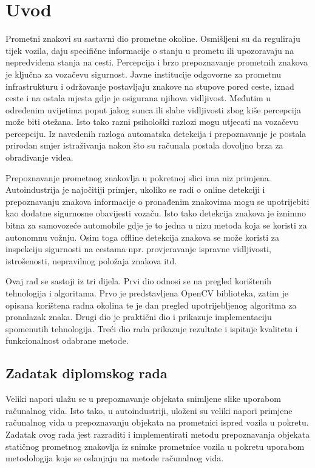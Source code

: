 \newpage

\setcounter{page}{1}
\setcounter{figure}{0}
\section{Uvod}%
\label{sec:Uvod}

Prometni znakovi su sastavni dio prometne okoline. Osmišljeni su da
reguliraju tijek vozila, daju specifične informacije o stanju u prometu
ili upozoravaju na nepredviđena stanja na cesti. Percepcija i brzo
prepoznavanje prometnih znakova je ključna za vozačevu sigurnost. Javne
institucije odgovorne za prometnu infrastrukturu i održavanje
postavljaju znakove na stupove pored ceste, iznad ceste i na ostala
mjesta gdje je osigurana njihova vidljivost. Međutim u određenim
uvijetima poput jakog sunca ili slabe vidljivosti zbog kiše percepcija
može biti otežana. Isto tako razni psihološki razlozi mogu utjecati na
vozačevu percepciju. Iz navedenih razloga automatska detekcija i
prepoznavanje je postala prirodan smjer istraživanja nakon što su
računala postala dovoljno brza za obrađivanje videa.   

Prepoznavanje prometnog znakovlja u pokretnoj slici ima niz primjena.
Autoindustrija je najočitiji primjer, ukoliko se radi o online detekciji
i prepoznavanju znakova informacije o pronađenim znakovima mogu se
upotrijebiti kao dodatne sigurnosne obavijesti vozaču. Isto tako
detekcija znakova je iznimno bitna za samovozeće automobile gdje je to
jedna u nizu metoda koja se koristi za autonomnu vožnju. Osim toga
offline detekcija znakova se može koristi za inspekciju sigurnosti na
cestama npr. provjeravanje ispravne vidljivosti, istrošenosti,
nepravilnog položaja znakova itd. 

Ovaj rad se sastoji iz tri dijela. Prvi dio odnosi se na pregled
korištenih tehnologija i algoritama. Prvo je predstavljena OpenCV
biblioteka, zatim je opisana korištena radna okolina te je dan pregled
upotrijebljenog algoritma za pronalazak znaka. Drugi dio je praktični
dio i prikazuje implementaciju spomenutih tehnologija. Treći dio rada
prikazuje rezultate i ispituje kvalitetu i funkcionalnost odabrane
metode.


\newpage
\subsection{Zadatak diplomskog rada} %
\label{sub:Zadatak diplomskog rada}
Veliki napori ulažu se u prepoznavanje objekata snimljene slike uporabom
računalnog vida. Isto tako, u autoindustriji, uloženi su veliki napori
primjene računalnog vida u prepoznavanju objekata na prometnici ispred
vozila u pokretu. Zadatak ovog rada jest razraditi i implementirati
metodu prepoznavanja objekata statičnog prometnog znakovlja iz snimke
prometnice vozila u pokretu uporabom metodologija koje se oslanjaju na
metode računalnog vida.


